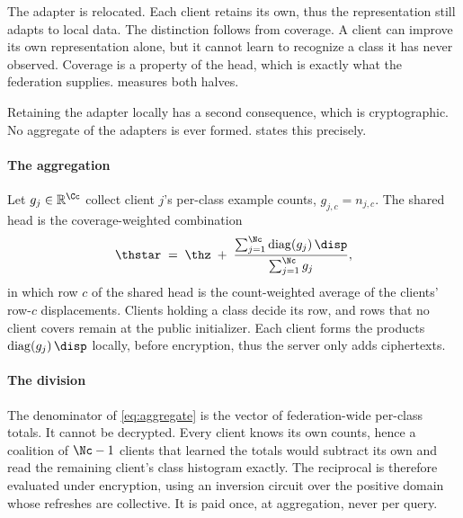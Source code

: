 The adapter is relocated. Each client retains its own, thus the
representation still adapts to local data. The distinction follows from coverage. A client
can improve its own representation alone, but it cannot learn to recognize a class
it has never observed. Coverage is a property of the head, which is exactly what
the federation supplies.  measures both halves.

Retaining the adapter locally has a second consequence, which is cryptographic. No
aggregate of the adapters is ever formed.  states
this precisely.

\paragraph{The aggregation} Let $g_{j}\in\mathbb{R}^{\Cc}$ collect client $j$'s
per-class example counts, $g_{j,c}=n_{j,c}$. The shared head is the
coverage-weighted combination
\begin{equation}
\label{eq:aggregate}
\thstar \;=\; \thz \;+\; \frac{\sum_{j=1}^{\Nc} \mathrm{diag}(g_j)\,\disp}
                              {\sum_{j=1}^{\Nc} g_j},
\end{equation}
in which row $c$ of the shared head is the count-weighted average of the clients'
row-$c$ displacements. Clients holding a class decide its row, and rows that no
client covers remain at the public initializer. Each client forms the products
$\mathrm{diag}(g_j)\,\disp$ locally, before encryption, thus the server only adds ciphertexts.

\paragraph{The division} The denominator of \cref{eq:aggregate} is the vector of
federation-wide per-class totals. It cannot be decrypted. Every client knows its
own counts, hence a coalition of $\Nc-1$ clients that learned the totals would
subtract its own and read the remaining client's class histogram exactly. The reciprocal
is therefore evaluated under encryption, using an inversion circuit over the
positive domain whose refreshes are collective. It is paid once, at aggregation, never per
query.


